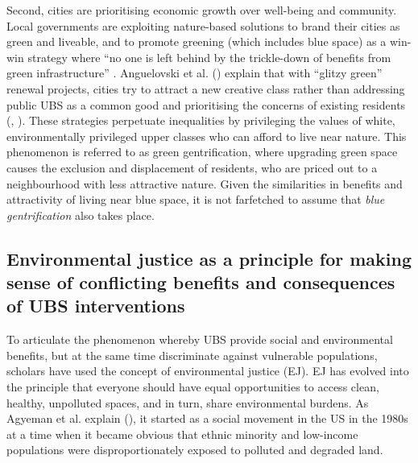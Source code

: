 \documentclass{article}
\newcommand{\alignedmarginpar}[1]{%
        \marginpar{\raggedright\small #1}
    }
\begin{document}
Second, cities are prioritising economic growth over well-being and community. Local governments are exploiting nature-based solutions to brand their cities as green and liveable,
and to promote greening (which includes blue space) as a win-win strategy where ``no one is left behind by the trickle-down of benefits from green infrastructure'' \parencite{anguelovski2021green}.
Anguelovski et al. (\citeyear{anguelovski2021green}) explain that with ``glitzy green'' renewal projects, cities try to attract a new creative class rather than addressing public UBS as a common good and prioritising the concerns of existing residents (\cite{wessells2014urban}, \cite{anguelovski2020expanding}).
These strategies perpetuate inequalities by privileging the values of white, environmentally privileged upper classes who can afford to live near nature. This phenomenon is referred to as green gentrification, where upgrading green space causes the exclusion and displacement of residents, who are priced out to a neighbourhood with less attractive nature. Given the similarities in benefits and attractivity of living near blue space, it is not farfetched to assume that \textit{blue gentrification} also takes place.

\subsection{Environmental justice as a principle for making sense of conflicting benefits and consequences of UBS interventions} 
\alignedmarginpar{But is EJ still useful here?}

To articulate the phenomenon whereby UBS provide social and environmental benefits, but at the same time discriminate against vulnerable populations, scholars have used the concept of environmental justice (EJ).
EJ has evolved into the principle that everyone should have equal opportunities to access clean, healthy, unpolluted spaces, and in turn, share environmental burdens. As Agyeman et al. explain (\citeyear{agyeman2016trends}), it started as a social movement in the US in the 1980s at a time when it became obvious that ethnic minority and low-income populations were disproportionately exposed to polluted and degraded land.
\end{document}
